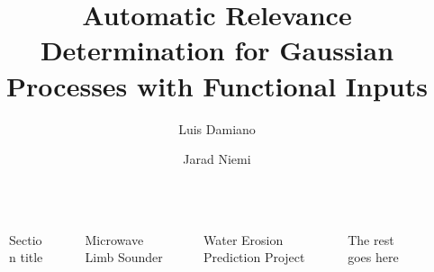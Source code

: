 \documentclass[final]{beamer}
\title{Automatic Relevance Determination
  for Gaussian Processes with Functional Inputs}
\author{
  Luis Damiano \inst{1} \and
  Jarad Niemi \inst{1}}
\institute[Iowa State]{
  \inst{1} Department of Statistics, Iowa State University}
\newlength{\sepwidth}
\newlength{\colwidth}
\newlength{\padwidth}
\newcommand{\separatorcolumn}{\begin{column}{\sepwidth}\end{column}}
\newcommand{\shortlipsum}{{\color{gray!99} \lipsum[1][1-10]}}
\begin{document}
\begin{frame}[t]
\begin{columns}[t]

  \separatorcolumn{}

  \begin{column}{\colwidth}
    \begin{block}{Section title}
      \shortlipsum{}
    \end{block}
  \end{column}

  \separatorcolumn{}

  \begin{column}{\colwidth}
    \begin{block}{Microwave Limb Sounder}
      \shortlipsum{}
    \end{block}
  \end{column}

  \separatorcolumn{}

  \begin{column}{\colwidth}
    \begin{block}{Water Erosion Prediction Project}
      \shortlipsum{}
    \end{block}
  \end{column}

  \separatorcolumn{}

  \begin{column}{\colwidth}
    \begin{block}{The rest goes here}
      \shortlipsum{}
    \end{block}
  \end{column}

  \separatorcolumn{}

  \vrule{}
  \begin{column}{\padwidth}
  \end{column}

\end{columns}
\end{frame}
\end{document}
